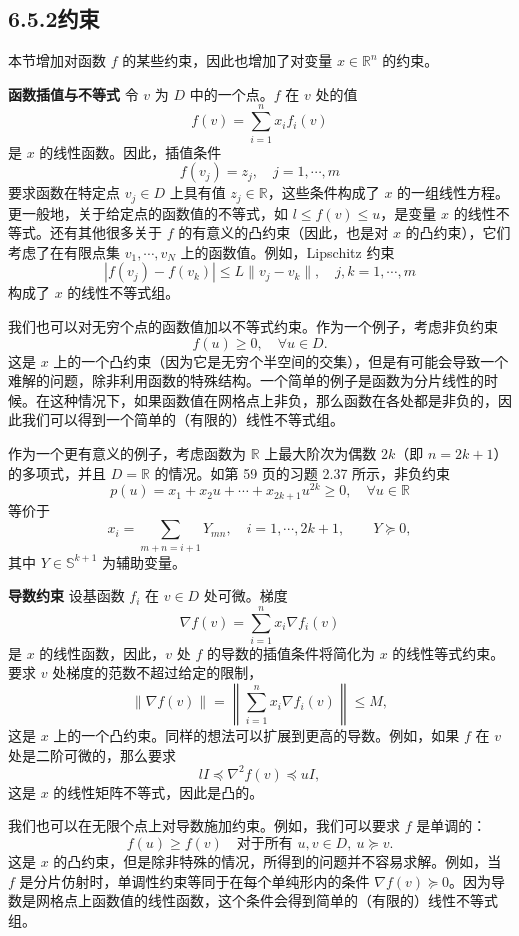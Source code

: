 \documentclass[UTF8, 12pt, fontset=fandol, oneside]{ctexart}
\begin{document}
\subsection*{6.5.2\quad 约束}

本节增加对函数 $f$ 的某些约束，因此也增加了对变量 $x\in\mathbb{R}^n$ 的约束。

\noindent\textbf{函数插值与不等式}\quad
令 $v$ 为 $D$ 中的一个点。$f$ 在 $v$ 处的值
\[
f(v)=\sum_{i=1}^n x_if_i(v)
\]
是 $x$ 的线性函数。因此，插值条件
\[
f(v_j)=z_j,\quad j=1,\cdots,m
\]
要求函数在特定点 $v_j\in D$ 上具有值 $z_j\in\mathbb{R}$，这些条件构成了 $x$ 的一组线性方程。更一般地，关于给定点的函数值的不等式，如 $l\leq f(v)\leq u$，是变量 $x$ 的线性不等式。还有其他很多关于 $f$ 的有意义的凸约束（因此，也是对 $x$ 的凸约束），它们考虑了在有限点集 $v_1,\cdots,v_N$ 上的函数值。例如，Lipschitz 约束
\[
|f(v_j)-f(v_k)|\leq L\|v_j-v_k\|,\quad j,k=1,\cdots,m
\]
构成了 $x$ 的线性不等式组。

我们也可以对无穷个点的函数值加以不等式约束。作为一个例子，考虑非负约束
\[
f(u)\geq 0,\quad \forall u\in D.
\]
这是 $x$ 上的一个凸约束（因为它是无穷个半空间的交集），但是有可能会导致一个难解的问题，除非利用函数的特殊结构。一个简单的例子是函数为分片线性的时候。在这种情况下，如果函数值在网格点上非负，那么函数在各处都是非负的，因此我们可以得到一个简单的（有限的）线性不等式组。

作为一个更有意义的例子，考虑函数为 $\mathbb{R}$ 上最大阶次为偶数 $2k$（即 $n=2k+1$）的多项式，并且 $D=\mathbb{R}$ 的情况。如第 59 页的习题 2.37 所示，非负约束
\[
p(u)=x_1+x_2u+\cdots+x_{2k+1}u^{2k}\geq 0,\quad \forall u\in\mathbb{R}
\]
等价于
\[
x_i=\sum_{m+n=i+1}Y_{mn},\quad i=1,\cdots,2k+1,\qquad Y\succeq 0,
\]
其中 $Y\in\mathbb{S}^{k+1}$ 为辅助变量。

\noindent\textbf{导数约束}\quad
设基函数 $f_i$ 在 $v\in D$ 处可微。梯度
\[
\nabla f(v)=\sum_{i=1}^n x_i\nabla f_i(v)
\]
是 $x$ 的线性函数，因此，$v$ 处 $f$ 的导数的插值条件将简化为 $x$ 的线性等式约束。要求 $v$ 处梯度的范数不超过给定的限制，
\[
\|\nabla f(v)\|=\left\|\sum_{i=1}^n x_i\nabla f_i(v)\right\|\leq M,
\]
这是 $x$ 上的一个凸约束。同样的想法可以扩展到更高的导数。例如，如果 $f$ 在 $v$ 处是二阶可微的，那么要求
\[
lI\preceq \nabla^2 f(v)\preceq uI,
\]
这是 $x$ 的线性矩阵不等式，因此是凸的。

我们也可以在无限个点上对导数施加约束。例如，我们可以要求 $f$ 是单调的：
\[
f(u)\geq f(v) \quad \text{对于所有 } u,v\in D,\ u\succeq v.
\]
这是 $x$ 的凸约束，但是除非特殊的情况，所得到的问题并不容易求解。例如，当 $f$ 是分片仿射时，单调性约束等同于在每个单纯形内的条件 $\nabla f(v)\succeq 0$。因为导数是网格点上函数值的线性函数，这个条件会得到简单的（有限的）线性不等式组。
\end{document}
